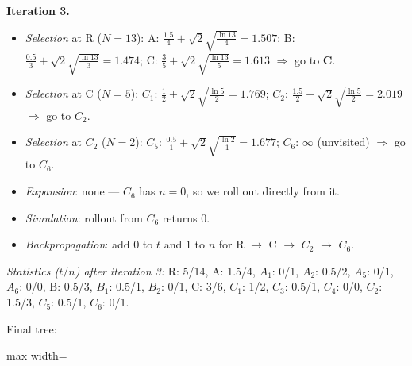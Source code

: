 \documentclass[11pt,a4paper]{article}
\begin{document}
\begin{solbox}
\smallskip
\textbf{Iteration 3.}
\begin{itemize}[leftmargin=1.5em,itemsep=1pt]
\item \emph{Selection} at R ($N=13$): A: $\frac{1.5}{4} + \sqrt2\sqrt{\frac{\ln 13}{4}} = 1.507$; B: $\frac{0.5}{3} + \sqrt2\sqrt{\frac{\ln 13}{3}} = 1.474$; C: $\frac{3}{5} + \sqrt2\sqrt{\frac{\ln 13}{5}} = 1.613$ $\Rightarrow$ go to \textbf{C}.
\item \emph{Selection} at C ($N=5$): $C_{1}$: $\frac{1}{2} + \sqrt2\sqrt{\frac{\ln 5}{2}} = 1.769$; $C_{2}$: $\frac{1.5}{2} + \sqrt2\sqrt{\frac{\ln 5}{2}} = 2.019$ $\Rightarrow$ go to \textbf{$C_{2}$}.
\item \emph{Selection} at $C_{2}$ ($N=2$): $C_{5}$: $\frac{0.5}{1} + \sqrt2\sqrt{\frac{\ln 2}{1}} = 1.677$; $C_{6}$: $\infty$ (unvisited) $\Rightarrow$ go to \textbf{$C_{6}$}.
\item \emph{Expansion}: none --- \textbf{$C_{6}$} has $n=0$, so we roll out directly from it.
\item \emph{Simulation}: rollout from $C_{6}$ returns $0$.
\item \emph{Backpropagation}: add $0$ to $t$ and $1$ to $n$ for R $\to$ C $\to$ $C_{2}$ $\to$ $C_{6}$.
\end{itemize}
\textit{Statistics ($t/n$) after iteration 3:} R: 5/14, A: 1.5/4, $A_{1}$: 0/1, $A_{2}$: 0.5/2, $A_{5}$: 0/1, $A_{6}$: 0/0, B: 0.5/3, $B_{1}$: 0.5/1, $B_{2}$: 0/1, C: 3/6, $C_{1}$: 1/2, $C_{3}$: 0.5/1, $C_{4}$: 0/0, $C_{2}$: 1.5/3, $C_{5}$: 0.5/1, $C_{6}$: 0/1.\par Final tree:\begin{center}
\begin{adjustbox}{max width=\linewidth}
\end{adjustbox}
\end{center}
\end{solbox}
\end{document}
